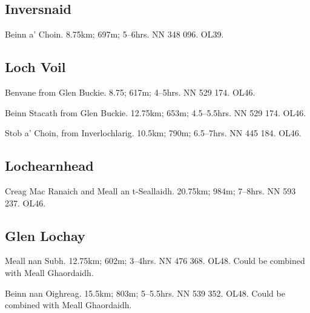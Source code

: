 
\subsection{Inversnaid}

\begin{munros}
\item
Beinn a' Choin.  8.75km; 697m; 5--6hrs.  NN 348 096.  OL39.
\end{munros}


\subsection{Loch Voil}

\begin{munros}
\item
Benvane from Glen Buckie.  8.75; 617m; 4--5hrs.  NN 529 174.  OL46.

\item
Beinn Stacath from Glen Buckie.  12.75km; 653m; 4.5--5.5hrs. NN 529 174.
OL46.

\item
Stob a' Choin, from Inverlochlarig.  10.5km; 790m; 6.5--7hrs.  NN 445 184.
OL46.  
\end{munros}


\subsection{Lochearnhead}

\begin{munros}
\item
Creag Mac Ranaich and Meall an t-Seallaidh.  20.75km; 984m; 7--8hrs.
NN 593 237.  OL46. 
\end{munros}


\subsection{Glen Lochay}

\begin{munros}
\item
Meall nan Subh.  12.75km; 602m; 3--4hrs.  NN 476 368.  OL48.  Could be
combined with Meall Ghaordaidh.

\item
Beinn nan Oighreag.  15.5km; 803m; 5--5.5hrs.  NN 539 352.  OL48.  Could be
combined with Meall Ghaordaidh.
\end{munros}

